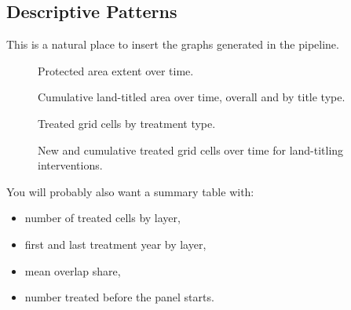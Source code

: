 \subsection{Descriptive Patterns}

This is a natural place to insert the graphs generated in the pipeline.

\begin{figure}[H]
    \centering
    \caption{Protected area extent over time.}
    \label{fig:wdpa-area-over-time}
\end{figure}

\begin{figure}[H]
    \centering
    \caption{Cumulative land-titled area over time, overall and by title type.}
    \label{fig:land-title-area-over-time}
\end{figure}

\begin{figure}[H]
    \centering
    \caption{Treated grid cells by treatment type.}
    \label{fig:treatment-type-cells}
\end{figure}

\begin{figure}[H]
    \centering
    \caption{New and cumulative treated grid cells over time for land-titling interventions.}
    \label{fig:titling-grid-cells-over-time}
\end{figure}

You will probably also want a summary table with:

\begin{itemize}
    \item number of treated cells by layer,
    \item first and last treatment year by layer,
    \item mean overlap share,
    \item number treated before the panel starts.
\end{itemize}
